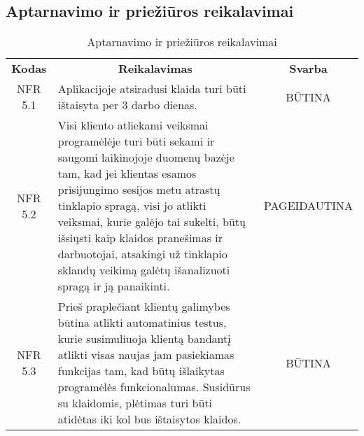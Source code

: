\documentclass{VUMIFPSkursinis}
\begin{document}
\subsection{Aptarnavimo ir priežiūros reikalavimai}
\begin{center}
	\begin{table}[H]
	\begin{tabular}{|p{2cm}|p{}|p{}|}
	\hline
	    \rowcolor{lightgray}
		\multicolumn{3}{|c|}{Aptarnavimo ir priežiūros reikalavimai}\\
		
	\hline
		\multicolumn{1}{|c|}{{\bfseries Kodas}}&
		\multicolumn{1}{|c|}{{\bfseries Reikalavimas}}&
		\multicolumn{1}{|c|}{{\bfseries Svarba}}\\
	\hline 	
		\multicolumn{1}{|c|}{NFR 5.1}&
		{Aplikacijoje atsiradusi klaida turi būti ištaisyta per 3 darbo dienas.}&
		\multicolumn{1}{|c|}{BŪTINA}\\	
	
	\hline 	
		\multicolumn{1}{|c|}{NFR 5.2}&
		{Visi kliento atliekami veiksmai programėlėje turi būti sekami ir saugomi laikinojoje duomenų bazėje tam, kad jei klientas esamos prisijungimo sesijos metu atrastų tinklapio spragą, visi jo atlikti veiksmai, kurie galėjo tai sukelti, būtų išsiųsti kaip klaidos pranešimas ir darbuotojai, atsakingi už tinklapio sklandų veikimą galėtų išanalizuoti spragą ir ją panaikinti.}&
		\multicolumn{1}{|p{1.5cm}|}{PAGEIDAUTINA}\\
	
	\hline 	
		\multicolumn{1}{|c|}{NFR 5.3}&
		{Prieš praplečiant klientų galimybes būtina atlikti automatinius testus, kurie susimuliuoja klientą bandantį atlikti visas naujas jam pasiekiamas funkcijas tam, kad būtų išlaikytas programėlės funkcionalumas. Susidūrus su klaidomis, plėtimas turi būti atidėtas iki kol bus ištaisytos klaidos.}&
		\multicolumn{1}{|c|}{BŪTINA}\\	
		
	\hline 	
	
	\end{tabular}
	\caption{Aptarnavimo ir priežiūros reikalavimai}
	\label{table:Aptarnavimoirpriežiūrosreikalavimai}
	\end{table}

\end{center}
\end{document}
